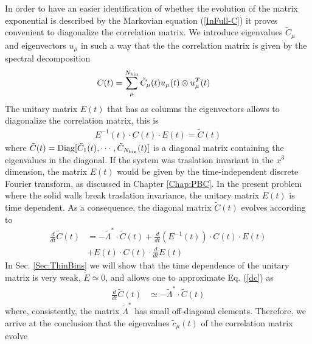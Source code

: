 \documentclass[b5paper,openright,11pt]{book}
\newcommand{\esc}{\!\cdot\!}
\begin{document}
In order to have an easier  identification of whether the evolution of
the  matrix  exponential  is   described  by  the  Markovian  equation
(\ref{InFull-C}) it  proves convenient to diagonalize  the correlation
matrix.   We introduce  eigenvalues  $\tilde{C}_\mu$ and  eigenvectors
$u_\mu$ in such a way that the  the correlation matrix is given by the
spectral decomposition
\begin{align}
  C(t)&=\sum_\mu^{N_{\rm bin}}\tilde{C}_\mu(t) u_\mu(t) \otimes u_\mu^T(t)
\label{spectral}
\end{align}
The unitary matrix $E(t)$ that  has as columns the eigenvectors allows
to diagonalize the correlation matrix, this is
\begin{align}
  E^{-1}(t)\esc C(t)\esc E(t)=\tilde{C}(t)
\label{diag}
\end{align}
where $\tilde{C}(t)={\rm Diag}[\tilde{C}_1(t),\cdots,\tilde{C}_{N_{\rm
    bin}}(t)]$ is a diagonal matrix  containing the eigenvalues in the
diagonal.   If  the  system  was traslation  invariant  in  the  $x^3$
dimension, the  matrix $E(t)$ would  be given by  the time-independent
discrete Fourier  transform, as discussed  in Chapter  \ref{Chap:PBC}.   In the
present problem where the solid walls break traslation invariance, the
unitary  matrix  $E(t)$ is  time  dependent.   As a  consequence,  the
diagonal matrix $\tilde{C}(t)$ evolves according to
\begin{align}
\frac{d}{dt}  \tilde{C}(t)&=-\tilde{\Lambda}^*\esc \tilde{C}(t)
  +\frac{d }{dt}(E^{-1}(t)) \esc C(t)\esc E(t)\nonumber\\
  &+E(t)\esc C(t)\esc \frac{d }{dt}E(t)  
\label{dc}
\end{align}
In Sec. \ref{Sec:ThinBins} we will show that the time dependence of the unitary  matrix is
very weak, $\dot{E}\simeq 0$, and allows one to approximate Eq. (\ref{dc}) as
\begin{align}
\frac{d}{dt}  \tilde{C}(t)&\simeq-\tilde{\Lambda}^*\esc \tilde{C}(t)
\label{Ctilde}
\end{align}
where,   consistently,  the   matrix  $\tilde{\Lambda}^*$   has  small
off-diagonal elements.   Therefore, we  arrive at the  conclusion that
the eigenvalues  $\tilde{c}_\mu(t)$ of  the correlation  matrix evolve
\end{document}
